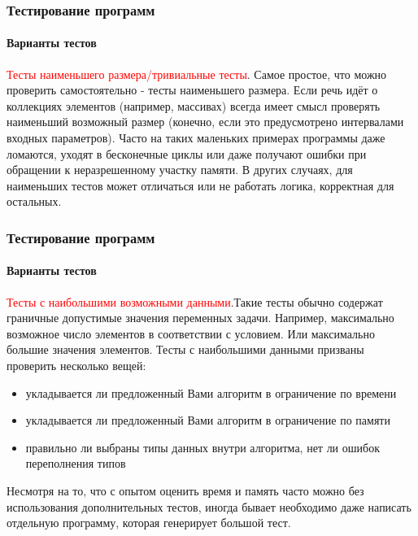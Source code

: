 \documentclass[aspectratio=169]{beamer}
\begin{document}
\begin{frame}
\frametitle{Тестирование программ}
\framesubtitle{Варианты тестов}
\justifying
\textcolor{red}{Тесты наименьшего размера/тривиальные тесты}. \newline Самое простое, что можно проверить самостоятельно - тесты наименьшего размера. Если речь идёт о коллекциях элементов (например, массивах) всегда имеет смысл проверять наименьший возможный размер (конечно, если это предусмотрено интервалами входных параметров). \newline\newline Часто на таких маленьких примерах программы даже ломаются, уходят в бесконечные циклы или даже получают ошибки при обращении к неразрешенному участку памяти. \newline\newline В других случаях, для наименьших тестов может отличаться или не работать логика, корректная для остальных.
\end{frame}


\begin{frame}
\frametitle{Тестирование программ}
\framesubtitle{Варианты тестов}
\justifying
\textcolor{red}{Тесты с наибольшими возможными данными}.\newline Такие тесты обычно содержат граничные допустимые значения переменных задачи. Например, максимально возможное число элементов в соответствии с условием. Или максимально большие значения элементов.\newline\newline
Тесты с наибольшими данными призваны проверить несколько вещей:

\begin{itemize}
\item{укладывается ли предложенный Вами алгоритм в ограничение по времени}
\item{укладывается ли предложенный Вами алгоритм в ограничение по памяти}
\item{правильно ли выбраны типы данных внутри алгоритма, нет ли ошибок переполнения типов}
\end{itemize}

Несмотря на то, что с опытом оценить время и память часто можно без использования дополнительных тестов, иногда бывает необходимо даже написать отдельную программу, которая генерирует большой тест.
\end{frame}
\end{document}
